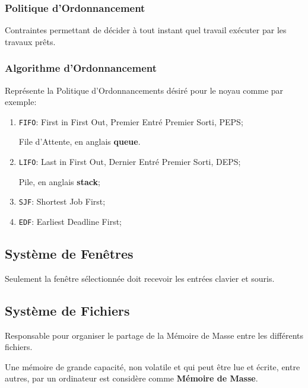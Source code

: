 \documentclass{article}
\begin{document}
\subsubsection{Politique d'Ordonnancement}
\begin{definition}
    Contraintes permettant de décider à tout instant quel travail exécuter par les travaux prêts.
\end{definition}
\subsubsection{Algorithme d'Ordonnancement}
\begin{definition}
    Représente la Politique d'Ordonnancements désiré pour le noyau comme par exemple:
    \begin{enumerate}[noitemsep, rightmargin = \leftmargin]
        \item \texttt{FIFO}: First in First Out, Premier Entré Premier Sorti, PEPS;
        \begin{example}
            File d'Attente, en anglais \textbf{queue}.
        \end{example}
        \item \texttt{LIFO}: Last in First Out, Dernier Entré Premier Sorti, DEPS;
        \begin{example}
            Pile, en anglais \textbf{stack};
        \end{example}
        \item \texttt{SJF}: Shortest Job First;
        \item \texttt{EDF}: Earliest Deadline First;
    \end{enumerate}
\end{definition}


\subsection{Système de Fenêtres}
\begin{definition}
    Seulement la fenêtre sélectionnée doit recevoir les entrées clavier et souris.
\end{definition}

\subsection{Système de Fichiers}
\begin{definition}
    Responsable pour organiser le partage de la Mémoire de Masse entre les différents fichiers.

    \begin{remark}
        Une mémoire de grande capacité, non volatile et qui peut être lue et écrite, entre autres, par un ordinateur est considère comme \textbf{Mémoire de Masse}.
    \end{remark}
\end{definition}
\end{document}
